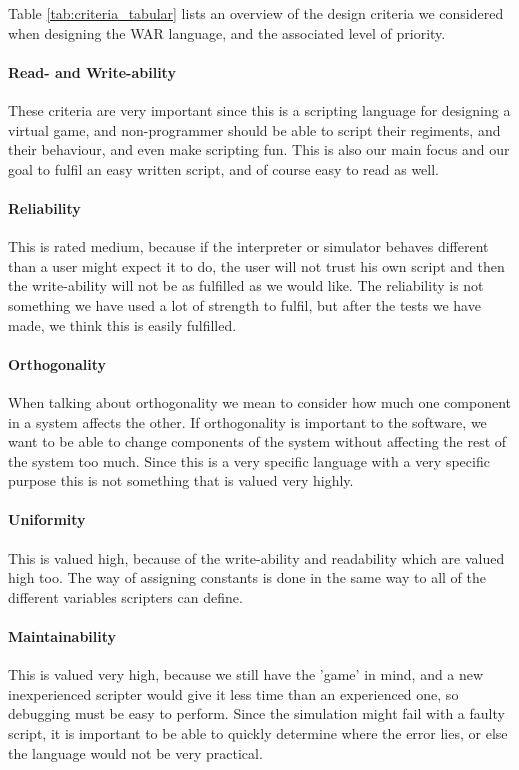 Table \ref{tab:criteria_tabular} lists an overview of the design criteria we considered when designing the WAR language, and the associated level of priority.

\paragraph{Read- and Write-ability} These criteria are very important since this is a scripting language for designing a virtual game, and non-programmer should be able to script their regiments, and their behaviour, and even make scripting fun. This is also our main focus and our goal to fulfil an easy written script, and of course easy to read as well.

\paragraph{Reliability} This is rated medium, because if the interpreter or simulator behaves different than a user might expect it to do, the user will not trust his own script and then the write-ability will not be as fulfilled as we would like. The reliability is not something we have used a lot of strength to fulfil, but after the tests we have made, we think this is easily fulfilled.

\paragraph{Orthogonality} When talking about orthogonality we mean to consider how much one component in a system affects the other. If orthogonality is important to the software, we want to be able to change components of the system without affecting the rest of the system too much. Since this is a very specific language with a very specific purpose this is not something that is valued very highly.
 
\paragraph{Uniformity} This is valued high, because of the write-ability and readability which are valued high too. The way of assigning constants is done in the same way to all of the different variables scripters can define.

\paragraph{Maintainability} This is valued very high, because we still have the 'game' in mind, and a new inexperienced scripter would give it less time than an experienced one, so debugging must be easy to perform. Since the simulation might fail with a faulty script, it is important to be able to quickly determine where the error lies, or else the language would not be very practical.

